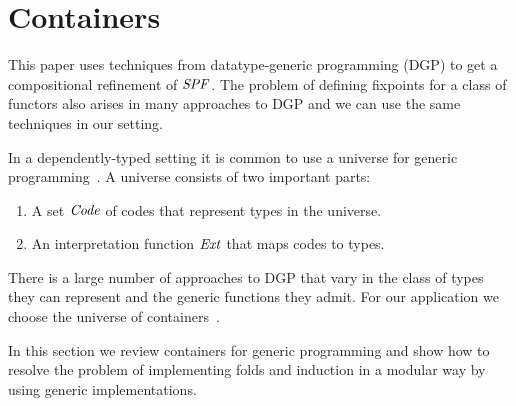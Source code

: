 \makeatother
\EndFmtInput
%




























\section{Containers}\label{sec:containers}


This paper uses techniques from datatype-generic programming (DGP) to
get a compositional refinement of \ensuremath{\Conid{SPF}}. The problem of defining
fixpoints for a class of functors also arises in many approaches to
DGP and we can use the same techniques in our setting.

In a dependently-typed setting it is common to use a universe for
generic programming~\cite{dgpdt,benke:universes}. A universe consists
of two important parts:

\begin{enumerate}
\item A set \ensuremath{\Conid{Code}} of codes that represent types in the universe.
\item An interpretation function \ensuremath{\Conid{Ext}} that maps codes to types.
\end{enumerate}


There is a large number of approaches to DGP that vary in the class of
types they can represent and the generic functions they admit. For our
application we choose the universe of containers~\cite{containers}.

In this section we review containers for generic programming and show
how to resolve the problem of implementing folds and induction in a
modular way by using generic implementations.

